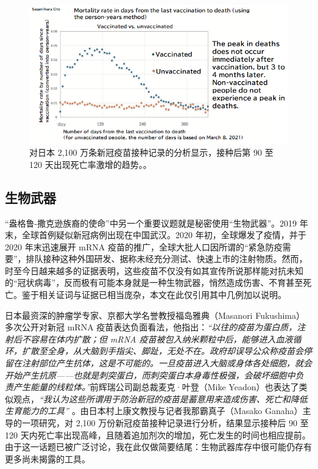 \documentclass[10pt,twocolumn,letterpaper]{article}
\begin{document}
\clearpage
\twocolumn

\begin{figure}[t]
\begin{center}
\includegraphics[width=1\textwidth]{japan.png}
\end{center}
   \caption{对日本 2,100 万条新冠疫苗接种记录的分析显示，接种后第 90 至 120 天出现死亡率激增的趋势。\cite{40,41}。}
   \label{fig:17}
\end{figure}

\subsection{生物武器}
“盎格鲁-撒克逊族裔的使命”中另一个重要议题就是秘密使用“生物武器”。2019 年末，全球首例疑似新冠病例出现在中国武汉。2020 年初，全球爆发了疫情，并于 2020 年末迅速展开 mRNA 疫苗的推广，全球大批人口因所谓的“紧急防疫需要”，排队接种这种外国研发、据称未经充分测试、快速上市的注射物质\cite{31}。然而，时至今日越来越多的证据表明，这些疫苗不仅没有如其宣传所说那样能对抗未知的“冠状病毒”，反而极有可能本身就是一种生物武器，悄然造成伤害、不育甚至死亡。鉴于相关证词与证据已相当庞杂，本文在此仅引用其中几例加以说明。

日本最资深的肿瘤学专家、京都大学名誉教授福岛雅典（Masanori Fukushima）多次公开对新冠 mRNA 疫苗表达负面看法，他指出\cite{35,36}：\textit{“以往的疫苗为蛋白质，注射后不容易在体内扩散；但 mRNA 疫苗被包入纳米颗粒中后，能够进入血液循环，扩散至全身，从大脑到手指尖、脚趾，无处不在。政府却误导公众称疫苗会停留在注射部位产生抗体，这是不可能的。一旦疫苗进入大脑或身体各处细胞，就会开始产生抗原——也就是刺突蛋白，而刺突蛋白本身毒性极强，会破坏细胞中负责产生能量的线粒体。”\cite{37,38}}前辉瑞公司副总裁麦克·叶登（Mike Yeadon）也表达了类似观点，\textit{“我认为这些所谓用于防治新冠的疫苗是蓄意用来造成伤害、死亡和降低生育能力的工具” \cite{39}}。由日本村上康文教授与记者我那霸真子（Masako Ganaha）主导的一项研究，对 2,100 万份新冠疫苗接种记录进行分析，结果显示接种后 90 至 120 天内死亡率出现高峰，且随着追加剂次的增加，死亡发生的时间也相应提前\cite{40,41}。
由于这一话题已被广泛讨论，我在此仅做简要结尾：生物武器库存中很可能仍存有更多尚未揭露的工具。
\end{document}
